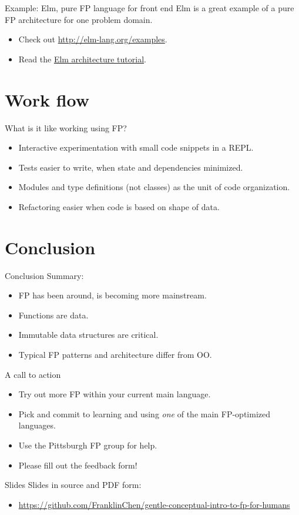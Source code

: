 \begin{frame}{Example: Elm, pure FP language for front end}
  Elm is a great example of a pure FP architecture for one problem
  domain.

  \begin{itemize}
  \item Check out \href{live Elm demo Web
      apps}{http://elm-lang.org/examples}.
  \item Read the \href{https://github.com/evancz/elm-architecture-tutorial/}{Elm
    architecture tutorial}.
  \end{itemize}
\end{frame}

\section{Work flow}

\begin{frame}{What is it like working using FP?}
  \begin{itemize}
  \item Interactive experimentation with small code snippets in a
    REPL.
  \item Tests easier to write, when state and dependencies minimized.
  \item Modules and type definitions (not classes) as the unit of code organization.
  \item Refactoring easier when code is based on shape of data.
  \end{itemize}
\end{frame}

\section{Conclusion}

\begin{frame}{Conclusion}
  Summary:
  \begin{itemize}
  \item FP has been around, is becoming more mainstream.
  \item Functions are data.
  \item Immutable data structures are critical.
  \item Typical FP patterns and architecture differ from OO.
  \end{itemize}

  \begin{block}{A call to action}
    \begin{itemize}
    \item Try out more FP within your current main language.
    \item Pick and commit to learning and using \emph{one} of the
      main FP-optimized languages.
    \item Use the Pittsburgh FP group for help.
    \item Please fill out the feedback form!
    \end{itemize}
  \end{block}
\end{frame}

\begin{frame}{Slides}
  Slides in source and PDF form:
  \begin{itemize}
  \item \url{https://github.com/FranklinChen/gentle-conceptual-intro-to-fp-for-humans}
  \end{itemize}
\end{frame}


